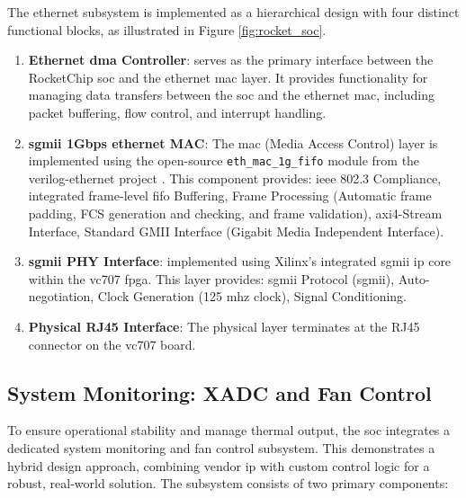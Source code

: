 The \acrshort{ethernet} subsystem is implemented as a hierarchical design with four distinct functional blocks, as illustrated in Figure \ref{fig:rocket_soc}. 

\begin{enumerate}
  \item \textbf{Ethernet \acrshort{dma} Controller}: serves as the primary interface between the RocketChip \acrshort{soc} and the \acrshort{ethernet} \acrshort{mac} layer. It provides functionality for managing data transfers between the \acrshort{soc} and the \acrshort{ethernet} \acrshort{mac}, including packet buffering, flow control, and interrupt handling.

  \item \textbf{\acrshort{sgmii} 1Gbps \acrshort{ethernet} MAC}: The \acrshort{mac} (Media Access Control) layer is implemented using the open-source \texttt{eth\_mac\_1g\_fifo} module from the verilog-ethernet project \cite{verilog-ethernet}. This component provides: \acrshort{ieee} 802.3 Compliance, integrated frame-level \acrshort{fifo} Buffering, Frame Processing (Automatic frame padding, FCS generation and checking, and frame validation), \acrshort{axi4}-Stream Interface, Standard GMII Interface (Gigabit Media Independent Interface).

  \item \textbf{\acrshort{sgmii} PHY Interface}: implemented using Xilinx's integrated \acrshort{sgmii} \acrshort{ip} core within the \acrshort{vc707} \acrshort{fpga}. This layer provides: \acrshort{sgmii} Protocol (\acrlong{sgmii}), Auto-negotiation, Clock Generation (125 \acrshort{mhz} clock), Signal Conditioning.

  \item \textbf{Physical RJ45 Interface}: The physical layer terminates at the RJ45 connector on the \acrshort{vc707} board.
\end{enumerate}

\subsection{System Monitoring: XADC and Fan Control}

To ensure operational stability and manage thermal output, the \acrshort{soc} integrates a dedicated system monitoring and fan control subsystem. This demonstrates a hybrid design approach, combining vendor \acrshort{ip} with custom control logic for a robust, real-world solution. The subsystem consists of two primary components:


